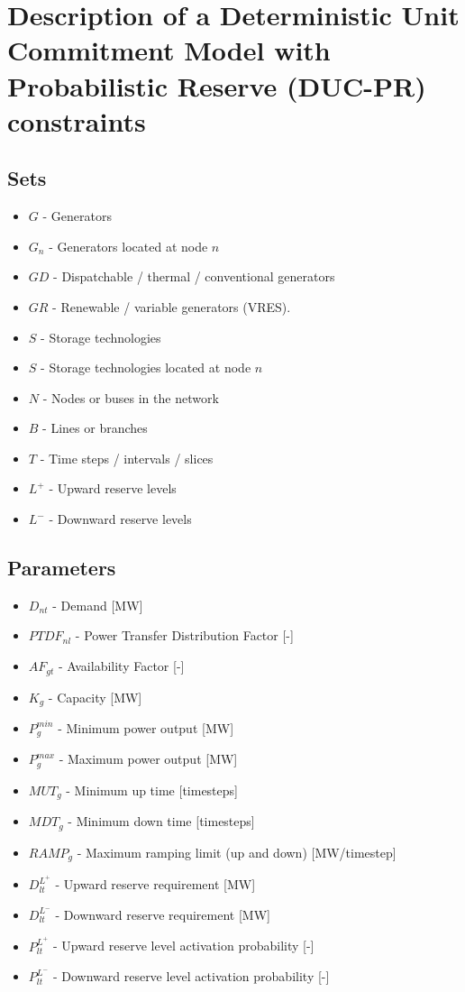 \documentclass[number,times]{elsarticle}
\begin{document}
\section{Description of a Deterministic Unit Commitment Model with Probabilistic Reserve (DUC-PR) constraints} \label{sec:model}

\subsection{Sets}

\begin{itemize}
    \item $G$ - Generators
    \item $G_n$ - Generators located at node $n$
    \item $GD$ - Dispatchable / thermal / conventional generators
    \item $GR$ - Renewable / variable generators (\ac{VRES}).
    \item $S$ - Storage technologies
    \item $S$ - Storage technologies located at node $n$
    \item $N$ - Nodes or buses in the network
    \item $B$ - Lines or branches
    \item $T$ - Time steps / intervals / slices
    \item $L^+$ - Upward reserve levels
    \item $L^-$ - Downward reserve levels
\end{itemize}

\subsection{Parameters}

\begin{itemize}
    \item $D_{nt}$ - Demand [MW]
    \item $PTDF_{nl}$ - Power Transfer Distribution Factor [-]
    \item $AF_{gt}$ - Availability Factor [-]
    \item $K_g$ - Capacity [MW]
    \item $P^{min}_g$ - Minimum power output [MW]
    \item $P^{max}_g$ - Maximum power output [MW]
    \item $MUT_g$ - Minimum up time [timesteps]
    \item $MDT_g$ - Minimum down time [timesteps]
    \item $RAMP_g$ - Maximum ramping limit (up and down) [MW/timestep]
    \item $D^{L^+}_{lt}$ - Upward reserve requirement [MW]
    \item $D^{L^-}_{lt}$ - Downward reserve requirement [MW]
    \item $P^{L^+}_{lt}$ - Upward reserve level activation probability [-]
    \item $P^{L^-}_{lt}$ - Downward reserve level activation probability [-]
\end{itemize}
\end{document}
